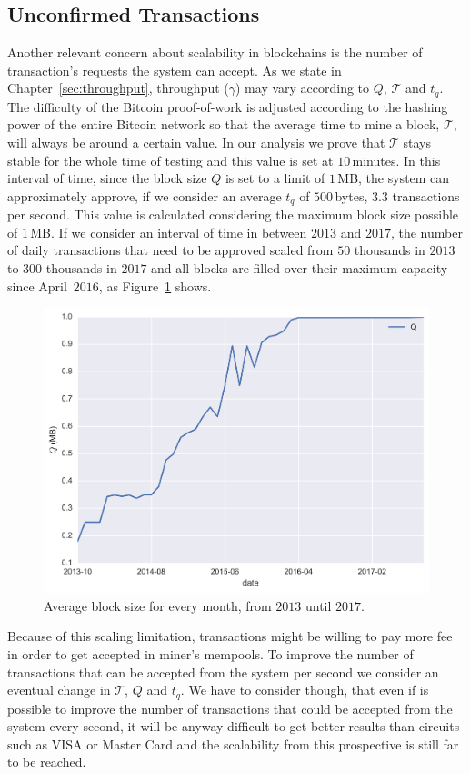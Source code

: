 \documentclass[USenglish]{uit-thesis}
\begin{document}
\subsection{Unconfirmed Transactions}
\label{sec:unconfirmedtxs}
Another relevant concern about scalability in blockchains
is the number of transaction's requests the system
can accept. As we state in Chapter~\ref{sec:throughput},
throughput ($\gamma$) may vary according to $Q$,
$\mathcal{T}$ and $t_q$.
The difficulty of the Bitcoin proof-of-work
is adjusted according to the hashing power of the entire
Bitcoin network so that the average time to mine a block, $\mathcal{T}$,
will always be around a certain value. In our analysis we prove
that $\mathcal{T}$ stays stable for the whole time of testing and this
value is set at $10$\,minutes. In this interval of time, since
the block size $Q$ is set to a limit of $1$\,MB, the system can
approximately approve, if we consider an average $t_q$
of $500$\,bytes, $3.3$ transactions per second. This value is calculated
considering the maximum block size possible of $1$\,MB.
If we consider an interval of time in between $2013$ and
$2017$, the number of daily transactions that need to be approved
scaled from $50$ thousands in $2013$ to $300$ thousands
in $2017$ and all blocks are filled over their maximum
capacity since April~$2016$, as Figure~\ref{fig:block_size} shows.
\begin{figure}[h]
	\centering
	\includegraphics[width=1\textwidth]{img/block_size}
	\caption{Average block size for every month, from $2013$ until $2017$.}
	\label{fig:block_size}
\end{figure}
Because of this scaling limitation, transactions might be willing
to pay more fee in order to get accepted in miner's mempools.
To improve the number of transactions that can be
accepted from the system per second we consider
an eventual change in $\mathcal{T}$, $Q$ and $t_q$.
We have to consider though, that even if is possible
to improve the number of transactions that could be
accepted from the system every second, it will be anyway
difficult to get better results than circuits such
as VISA or Master Card and the scalability from this
prospective is still far to be reached.
\end{document}
